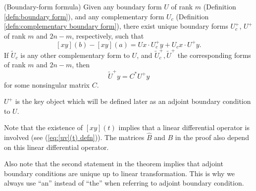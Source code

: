 \documentclass[11pt, oneside, a4paper]{article}
\begin{document}
\begin{thm}\cite[p.288]{CoddingtonLevinson}{(Boundary-form formula)}\label{thm:boundary form formula}
    Given any boundary form $U$ of rank $m$ (Definition \ref{defn:boundary form}), and any complementary form $U_c$ (Definition \ref{defn:complementary boundary form}), there exist unique boundary forms $U_c^+$, $U^+$ of rank $m$ and $2n-m$, respectively, such that
    \begin{equation}\label{eq:boundary form formula}
        [xy](b)-[xy](a) = Ux\cdot U_c^+y + U_{c}x\cdot U^+y.
    \end{equation}
    If $\tilde{U}_c$ is any other complementary form to $U$, and $\tilde{U}^+_c, \tilde{U}^+$ the corresponding forms of rank $m$ and $2n-m$, then
    \begin{equation}\label{eq:adjoint boundary forms unique up to linear transformation}
        \tilde{U}^+ y = C^*U^+y
    \end{equation}
    for some nonsingular matrix $C$.
\end{thm}
\begin{rmk}
    $U^+$ is the key object which will be defined later as an adjoint boundary condition to $U$.

    Note that the existence of $[xy](t)$ implies that a linear differential operator is involved (see (\ref{eq:[uv](t) defn})). The matrices $\hat{B}$ and $B$ in the proof also depend on this linear differential operator.

    Also note that the second statement in the theorem implies that adjoint boundary conditions are unique up to linear transformation. This is why we always use ``an'' instead of ``the'' when referring to adjoint boundary condition.
\end{rmk}
\end{document}
